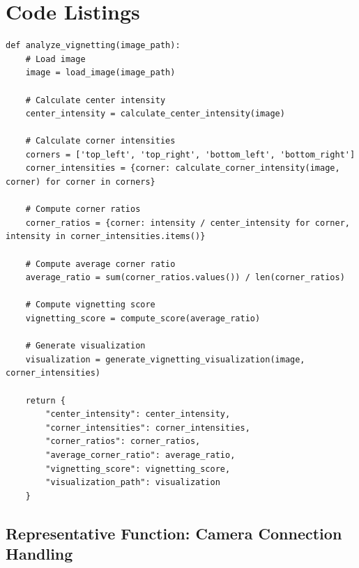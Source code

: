 \chapter{Code Listings}
\label{app:code_listings}

\begin{verbatim}
def analyze_vignetting(image_path):
    # Load image
    image = load_image(image_path)
    
    # Calculate center intensity
    center_intensity = calculate_center_intensity(image)
    
    # Calculate corner intensities
    corners = ['top_left', 'top_right', 'bottom_left', 'bottom_right']
    corner_intensities = {corner: calculate_corner_intensity(image, corner) for corner in corners}
    
    # Compute corner ratios
    corner_ratios = {corner: intensity / center_intensity for corner, intensity in corner_intensities.items()}
    
    # Compute average corner ratio
    average_ratio = sum(corner_ratios.values()) / len(corner_ratios)
    
    # Compute vignetting score
    vignetting_score = compute_score(average_ratio)
    
    # Generate visualization
    visualization = generate_vignetting_visualization(image, corner_intensities)
    
    return {
        "center_intensity": center_intensity,
        "corner_intensities": corner_intensities,
        "corner_ratios": corner_ratios,
        "average_corner_ratio": average_ratio,
        "vignetting_score": vignetting_score,
        "visualization_path": visualization
    }
\end{verbatim}
\section{Representative Function: Camera Connection Handling}
\label{app:camera_connection}

